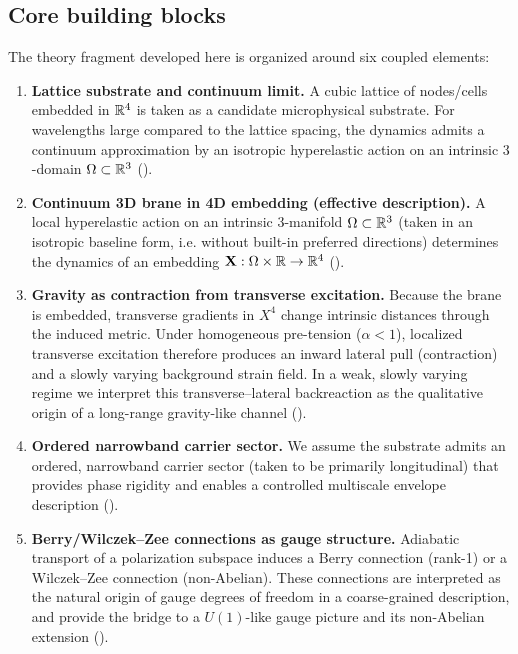 \subsection{Core building blocks}
The theory fragment developed here is organized around six coupled elements:
\begin{enumerate}
\item \textbf{Lattice substrate and continuum limit.}
A cubic lattice of nodes/cells embedded in $\mathbb{R}^4$ is taken as a candidate microphysical substrate.
For wavelengths large compared to the lattice spacing, the dynamics admits a continuum approximation by an
isotropic hyperelastic action on an intrinsic $3$-domain $\Omega\subset\mathbb{R}^3$ ().

\item \textbf{Continuum 3D brane in 4D embedding (effective description).}
A local hyperelastic action on an intrinsic $3$-manifold $\Omega\subset\mathbb{R}^3$ (taken in an isotropic baseline form, i.e. without built-in preferred directions) determines the
dynamics of an embedding $\mathbf{X}:\Omega\times\mathbb{R}\to\mathbb{R}^4$ ().

\item \textbf{Gravity as contraction from transverse excitation.}
Because the brane is embedded, transverse gradients in $X^4$ change intrinsic distances through the induced metric.
Under homogeneous pre-tension ($\alpha<1$), localized transverse excitation therefore produces an inward lateral pull
(contraction) and a slowly varying background strain field. In a weak, slowly varying regime we interpret this
transverse--lateral backreaction as the qualitative origin of a long-range gravity-like channel
().

\item \textbf{Ordered narrowband carrier sector.}
We assume the substrate admits an ordered, narrowband carrier sector (taken to be primarily longitudinal)
that provides phase rigidity and enables a controlled multiscale envelope description
().

\item \textbf{Berry/Wilczek--Zee connections as gauge structure.}
Adiabatic transport of a polarization subspace induces a Berry connection (rank-1) or a Wilczek--Zee
connection (non-Abelian).
These connections are interpreted as the natural origin of gauge degrees of freedom in a coarse-grained
description, and provide the bridge to a $U(1)$-like gauge picture and its non-Abelian extension
().


\end{enumerate}
